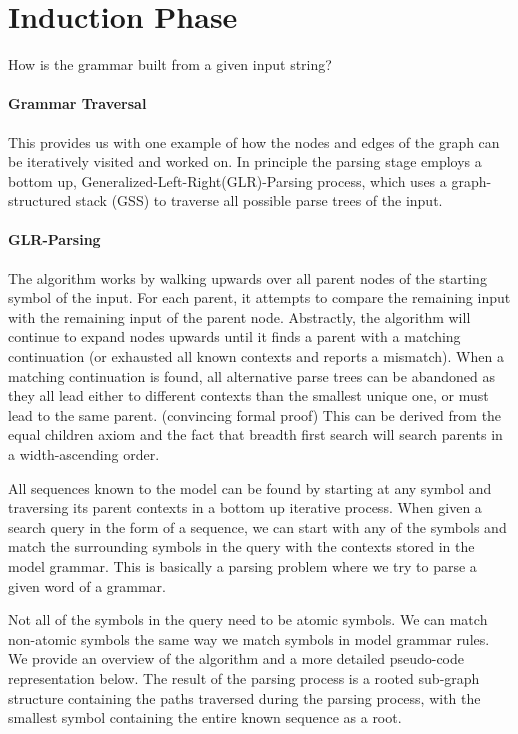 \section{Induction Phase}
How is the grammar built from a given input string?

\paragraph{Grammar Traversal}
This provides us with one example of how the nodes and edges of the graph can be
iteratively visited and worked on.
In principle the parsing stage employs a bottom up, Generalized-Left-Right(GLR)-Parsing 
process, which uses a graph-structured stack (GSS) to traverse all possible parse trees 
of the input.
%

\paragraph{GLR-Parsing}
The algorithm works by walking upwards over all parent nodes of the starting symbol of 
the input.
For each parent, it attempts to compare the remaining input with the remaining input of 
the parent node.
Abstractly, the algorithm will continue to expand nodes upwards until it finds a parent 
with a matching
continuation (or exhausted all known contexts and reports a mismatch).
When a matching continuation is found, all alternative parse trees can be abandoned as 
they all lead either
to different contexts than the smallest unique one, or must lead to the same parent.
(convincing formal proof)
This can be derived from the equal children axiom and the fact that breadth first search 
will search parents
in a width-ascending order.

All sequences known to the model can be found by starting at any symbol and traversing 
its parent contexts in a bottom up iterative process. When given a search query in the 
form of a sequence, we can start with any of the symbols and match the surrounding 
symbols in the query with the contexts stored in the model grammar. This is basically a 
parsing problem where we try to parse a given word of a grammar.

Not all of the symbols in the query need to be atomic symbols. We can match non-atomic symbols the same way we match symbols in model grammar rules. We provide an overview of the algorithm and a more detailed pseudo-code representation below. The result of the parsing process is a rooted sub-graph structure containing the paths traversed during the parsing process, with the smallest symbol containing the entire known sequence as a root. 

